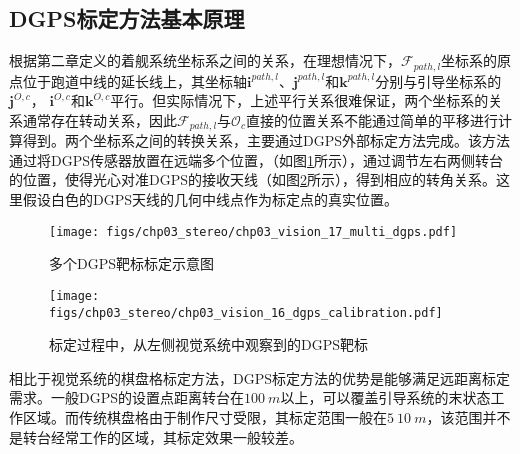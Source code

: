 \subsection{DGPS标定方法基本原理}
根据第二章定义的着舰系统坐标系之间的关系，在理想情况下，$\mathcal{F}_{path,l}$坐标系的原点位于跑道中线的延长线上，其坐标轴$\mathbf{i}^{path,l}$、$\mathbf{j}^{path,l}$和$\mathbf{k}^{path,l}$分别与引导坐标系的$\mathbf{j}^{O,c}$， $\mathbf{i}^{O,c}$和$\mathbf{k}^{O,c}$平行。但实际情况下，上述平行关系很难保证，两个坐标系的关系通常存在转动关系，因此$\mathcal{F}_{path,l}$与$\mathcal{O}_c$直接的位置关系不能通过简单的平移进行计算得到。两个坐标系之间的转换关系，主要通过DGPS外部标定方法完成\cite{liao2009automatic}。该方法通过将DGPS传感器放置在远端多个位置，（如图\ref{fig:chp03_vision_17_multi_dgps}所示），通过调节左右两侧转台的位置，使得光心对准DGPS的接收天线（如图\ref{fig:chp03_vision_16_dgps_calibration}所示），得到相应的转角关系。这里假设白色的DGPS天线的几何中线点作为标定点的真实位置。

\begin{figure}[htb]
	\centering
	\texttt{[image: figs/chp03\_stereo/chp03\_vision\_17\_multi\_dgps.pdf]}	
	\caption{多个DGPS靶标标定示意图}
	\label{fig:chp03_vision_17_multi_dgps}
\end{figure}


\begin{figure}[htb]
	\centering
	\texttt{[image: figs/chp03\_stereo/chp03\_vision\_16\_dgps\_calibration.pdf]}	
	\caption{标定过程中，从左侧视觉系统中观察到的DGPS靶标}
	\label{fig:chp03_vision_16_dgps_calibration}
\end{figure}


相比于视觉系统的棋盘格标定方法，DGPS标定方法的优势是能够满足远距离标定需求。一般DGPS的设置点距离转台在$100\ m$以上，可以覆盖引导系统的末状态工作区域。而传统棋盘格由于制作尺寸受限，其标定范围一般在$5~10\ m$，该范围并不是转台经常工作的区域，其标定效果一般较差。


